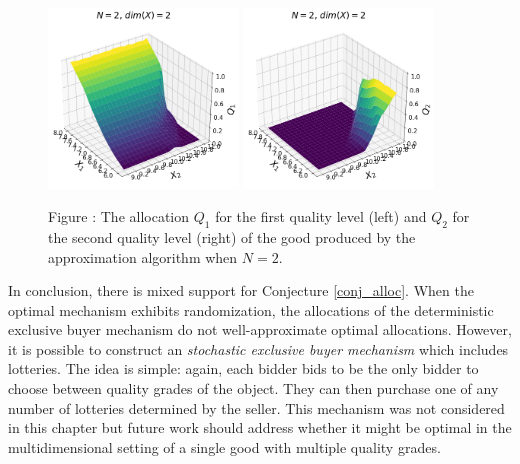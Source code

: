 \begin{figure}[H]
    \begin{center}
    \includegraphics[width=0.45\textwidth]{images/asymmetric_independent_belloni_Q1.png}
    \includegraphics[width=0.45\textwidth]{images/asymmetric_independent_belloni_Q2.png}
    \end{center}
    
    \vspace{1mm}
    \raggedright{\small {\sc Figure \thefig\label{fig:belloni_alloc_Q1}:} The allocation $Q_1$ for the first quality level (left) and $Q_2$ for the second quality level (right) of the good produced by the approximation algorithm when $N=2$.} 
\end{figure}

In conclusion, there is mixed support for Conjecture \ref{conj_alloc}. When the optimal mechanism exhibits randomization, the allocations of the deterministic exclusive buyer mechanism do not well-approximate optimal allocations. However, it is possible to construct an \textit{stochastic exclusive buyer mechanism} which includes lotteries. The idea is simple: again, each bidder bids to be the only bidder to choose between quality grades of the object. They can then purchase one of any number of lotteries determined by the seller. This mechanism was not considered in this chapter but future work should address whether it might be optimal in the multidimensional setting of a single good with multiple quality grades.





